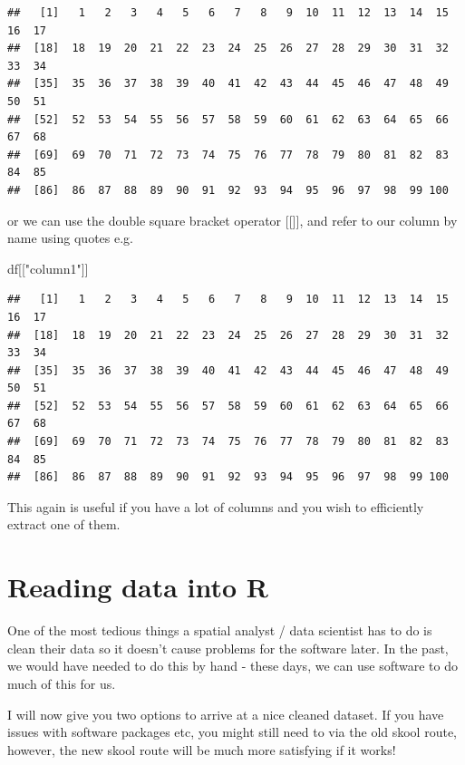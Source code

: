 \documentclass[]{book}
\newenvironment{Shaded}{\begin{snugshade}}{\end{snugshade}}
\newcommand{\NormalTok}[1]{#1}
\newcommand{\StringTok}[1]{\textcolor[rgb]{0.31,0.60,0.02}{#1}}
\begin{document}
\begin{verbatim}
##   [1]   1   2   3   4   5   6   7   8   9  10  11  12  13  14  15  16  17
##  [18]  18  19  20  21  22  23  24  25  26  27  28  29  30  31  32  33  34
##  [35]  35  36  37  38  39  40  41  42  43  44  45  46  47  48  49  50  51
##  [52]  52  53  54  55  56  57  58  59  60  61  62  63  64  65  66  67  68
##  [69]  69  70  71  72  73  74  75  76  77  78  79  80  81  82  83  84  85
##  [86]  86  87  88  89  90  91  92  93  94  95  96  97  98  99 100
\end{verbatim}

or we can use the double square bracket operator {[}{[}{]}{]}, and refer to our column by name using quotes e.g.

\begin{Shaded}
\begin{Highlighting}[]
\NormalTok{df[[}\StringTok{"column1"}\NormalTok{]]}
\end{Highlighting}
\end{Shaded}

\begin{verbatim}
##   [1]   1   2   3   4   5   6   7   8   9  10  11  12  13  14  15  16  17
##  [18]  18  19  20  21  22  23  24  25  26  27  28  29  30  31  32  33  34
##  [35]  35  36  37  38  39  40  41  42  43  44  45  46  47  48  49  50  51
##  [52]  52  53  54  55  56  57  58  59  60  61  62  63  64  65  66  67  68
##  [69]  69  70  71  72  73  74  75  76  77  78  79  80  81  82  83  84  85
##  [86]  86  87  88  89  90  91  92  93  94  95  96  97  98  99 100
\end{verbatim}

This again is useful if you have a lot of columns and you wish to efficiently extract one of them.

\hypertarget{reading-data-into-r}{%
\section{Reading data into R}\label{reading-data-into-r}}

One of the most tedious things a spatial analyst / data scientist has to do is clean their data so it doesn't cause problems for the software later. In the past, we would have needed to do this by hand - these days, we can use software to do much of this for us.

I will now give you two options to arrive at a nice cleaned dataset. If you have issues with software packages etc, you might still need to via the old skool route, however, the new skool route will be much more satisfying if it works!
\end{document}
